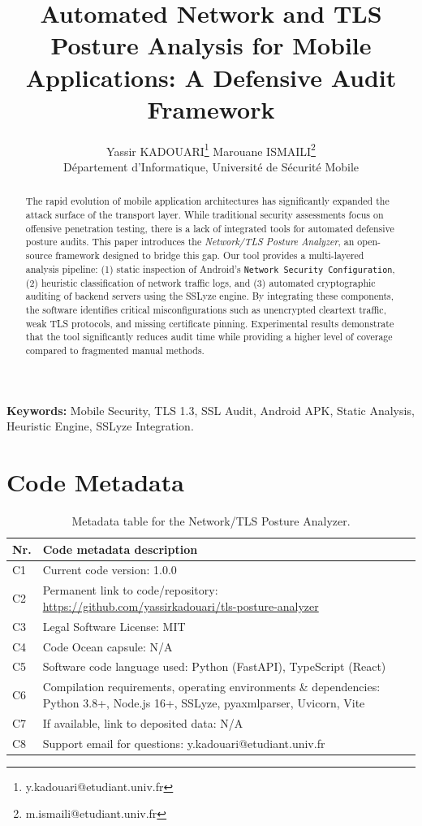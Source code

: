 \documentclass[11pt,a4paper]{article}
\title{\textbf{Automated Network and TLS Posture Analysis for Mobile Applications: A Defensive Audit Framework}}
\author{
    Yassir KADOUARI\footnote{y.kadouari@etudiant.univ.fr} \quad 
    Marouane ISMAILI\footnote{m.ismaili@etudiant.univ.fr} \\
    \small Département d'Informatique, Université de Sécurité Mobile
}
\date{}
\begin{document}
\maketitle

\begin{abstract}
The rapid evolution of mobile application architectures has significantly expanded the attack surface of the transport layer. While traditional security assessments focus on offensive penetration testing, there is a lack of integrated tools for automated defensive posture audits. This paper introduces the \textit{Network/TLS Posture Analyzer}, an open-source framework designed to bridge this gap. Our tool provides a multi-layered analysis pipeline: (1) static inspection of Android's \texttt{Network Security Configuration}, (2) heuristic classification of network traffic logs, and (3) automated cryptographic auditing of backend servers using the SSLyze engine. By integrating these components, the software identifies critical misconfigurations such as unencrypted cleartext traffic, weak TLS protocols, and missing certificate pinning. Experimental results demonstrate that the tool significantly reduces audit time while providing a higher level of coverage compared to fragmented manual methods.
\end{abstract}

\textbf{Keywords:} Mobile Security, TLS 1.3, SSL Audit, Android APK, Static Analysis, Heuristic Engine, SSLyze Integration.


\section*{Code Metadata}
\begin{table}[H]
\centering
\begin{tabular}{|l|p{10cm}|}
\hline
\textbf{Nr.} & \textbf{Code metadata description} \\
\hline
C1 & Current code version: 1.0.0 \\
\hline
C2 & Permanent link to code/repository: \url{https://github.com/yassirkadouari/tls-posture-analyzer} \\
\hline
C3 & Legal Software License: MIT \\
\hline
C4 & Code Ocean capsule: N/A \\
\hline
C5 & Software code language used: Python (FastAPI), TypeScript (React) \\
\hline
C6 & Compilation requirements, operating environments \& dependencies: Python 3.8+, Node.js 16+, SSLyze, pyaxmlparser, Uvicorn, Vite \\
\hline
C7 & If available, link to deposited data: N/A \\
\hline
C8 & Support email for questions: y.kadouari@etudiant.univ.fr \\
\hline
\end{tabular}
\caption{Metadata table for the Network/TLS Posture Analyzer.}
\end{table}
\end{document}

